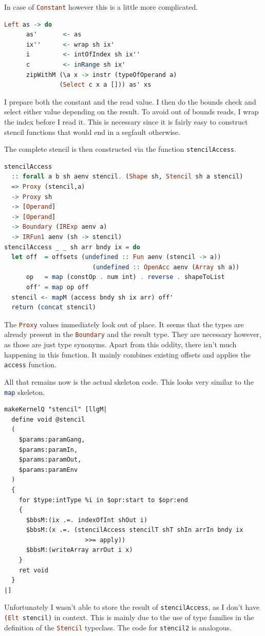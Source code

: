 \documentclass[a4paper,bibliography=totocnumbered,parskip,headsepline]{scrbook}
\begin{document}
In case of \lstinline[language=haskell]!Constant! however this is a little more complicated.
\begin{lstlisting}[language=haskell]
    Left as -> do
      as'       <- as
      ix''      <- wrap sh ix'
      i         <- intOfIndex sh ix''
      c         <- inRange sh ix'
      zipWithM (\a x -> instr (typeOfOperand a)
               (Select c x a [])) as' xs
\end{lstlisting}
I prepare both the constant and the read value.
I then do the bounds check and select either value depending on the result.
To avoid out of bounds reads, I wrap the index before I read it.
This is necessary since it is fairly easy to construct stencil functions that would end in a segfault otherwise.

The complete stencil is then constructed via the function \lstinline[language=haskell]!stencilAccess!.
\begin{lstlisting}[language=haskell]
stencilAccess
  :: forall a b sh aenv stencil. (Shape sh, Stencil sh a stencil)
  => Proxy (stencil,a)
  -> Proxy sh
  -> [Operand]
  -> [Operand]
  -> Boundary (IRExp aenv a)
  -> IRFun1 aenv (sh -> stencil)
stencilAccess _ _ sh arr bndy ix = do
  let off  = offsets (undefined :: Fun aenv (stencil -> a))
                        (undefined :: OpenAcc aenv (Array sh a))
      op   = map (constOp . num int) . reverse . shapeToList
      off' = map op off
  stencil <- mapM (access bndy sh ix arr) off'
  return (concat stencil)
\end{lstlisting}
The \lstinline[language=haskell]!Proxy! values immediately look out of place.
It seems that the types are already present in the \lstinline[language=haskell]!Boundary! and the result type.
They are necessary however, as those are just type synonyms.
Apart from this oddity, there isn't much happening in this function.
It mainly combines existing offsets and applies the \lstinline[language=haskell]!access! function.

All that remains now is the actual skeleton code.
This looks very similar to the \lstinline[language=haskell]!map! skeleton.
\begin{lstlisting}
makeKernelQ "stencil" [llgM|
  define void @stencil
  (
    $params:paramGang,
    $params:paramIn,
    $params:paramOut,
    $params:paramEnv
  )
  {
    for $type:intType %i in $opr:start to $opr:end
    {
      $bbsM:(ix .=. indexOfInt shOut i)
      $bbsM:(x .=. (stencilAccess stencilT shT shIn arrIn bndy ix
                      >>= apply))
      $bbsM:(writeArray arrOut i x)
    }
    ret void
  }
|]
\end{lstlisting}
Unfortunately I wasn't able to store the result of \lstinline[language=haskell]!stencilAccess!, as I don't have \lstinline[language=haskell]!(Elt stencil)! in context.
This is mainly due to the use of type families in the definition of the \lstinline[language=haskell]!Stencil! typeclass.
The code for \lstinline[language=haskell]!stencil2! is analogous.
\end{document}
